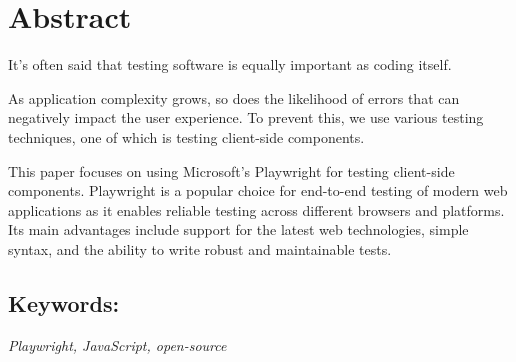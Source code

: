 \section*{Abstract}\label{sazetak_en}
It's often said that testing software is equally important as coding itself.

 As application complexity grows, so does the likelihood of errors that can negatively impact the user experience.
 To prevent this, we use various testing techniques, one of which is testing client-side components.

This paper focuses on using Microsoft's Playwright for testing client-side components.
Playwright is a popular choice for end-to-end testing of modern web applications as it enables reliable testing across different browsers and platforms.
Its main advantages include support for the latest web technologies, simple syntax, and the ability to write robust and maintainable tests.

\subsection*{Keywords:}\label{kw_en}
\textit{Playwright, JavaScript, open-source}